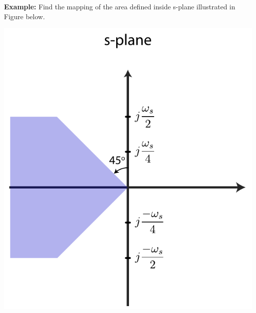 \documentclass[twoside]{article}
\begin{document}
\textbf{Example:} Find the mapping of the area defined inside s-plane
illustrated in Figure below.
%
    \begin{center}
\begin{minipage}[h]{0.5\linewidth}
    \begin{center}
      \includegraphics[width=\textwidth]{dampingexample}
    \end{center}
\end{minipage}
    \end{center}
%
\end{document}
